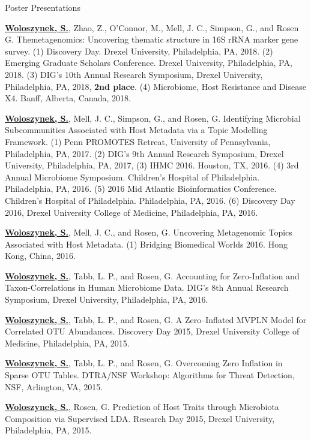 \begin{cventries}
\vspace{.5cm}
\cventry
    {}
    {Poster Presentations}
    {}
    {}
    {
     \begin{cvitems} %
        \item{\textbf{\underline{Woloszynek, S.}}, Zhao, Z., O’Connor, M., Mell, J. C., Simpson, G., and Rosen G. Themetagenomics: Uncovering thematic structure in 16S rRNA marker gene survey. (1) Discovery Day. Drexel University, Philadelphia, PA, 2018. (2) Emerging Graduate Scholars Conference. Drexel University, Philadelphia, PA, 2018. (3) DIG’s 10th Annual Research Symposium, Drexel University, Philadelphia, PA, 2018, \textbf{2nd place}. (4) Microbiome, Host Resistance and Disease X4. Banff, Alberta, Canada, 2018.}
        \item{\textbf{\underline{Woloszynek, S.}}, Mell, J. C., Simpson, G., and Rosen, G. Identifying Microbial Subcommunities Associated with Host Metadata via a Topic Modelling Framework. (1) Penn PROMOTES Retreat, University of Pennsylvania, Philadelphia, PA, 2017. (2) DIG’s 9th Annual Research Symposium, Drexel University, Philadelphia, PA, 2017, (3) IHMC 2016. Houston, TX, 2016. (4) 3rd Annual Microbiome Symposium. Children’s Hospital of Philadelphia. Philadelphia, PA, 2016. (5) 2016 Mid Atlantic Bioinformatics Conference. Children’s Hospital of Philadelphia. Philadelphia, PA, 2016. (6) Discovery Day 2016, Drexel University College of Medicine, Philadelphia, PA, 2016.}
        \item{\textbf{\underline{Woloszynek, S.}}, Mell, J. C., and Rosen, G. Uncovering Metagenomic Topics Associated with Host Metadata. (1) Bridging Biomedical Worlds 2016. Hong Kong, China, 2016.}
        \item{\textbf{\underline{Woloszynek, S.}}, Tabb, L. P., and Rosen, G. Accounting for Zero-Inflation and Taxon-Correlations in Human Microbiome Data. DIG’s 8th Annual Research Symposium, Drexel University, Philadelphia, PA, 2016.}
        \item{\textbf{\underline{Woloszynek, S.}}, Tabb, L. P., and Rosen, G. A Zero–Inflated MVPLN Model for Correlated OTU Abundances. Discovery Day 2015, Drexel University College of Medicine, Philadelphia, PA, 2015.}
        \item{\textbf{\underline{Woloszynek, S.}}, Tabb, L. P., and Rosen, G. Overcoming Zero Inflation in Sparse OTU Tables. DTRA/NSF Workshop: Algorithms for Threat Detection, NSF, Arlington, VA, 2015.}
        \item{\textbf{\underline{Woloszynek, S.}}, Rosen, G. Prediction of Host Traits through Microbiota Composition via Supervised LDA. Research Day 2015, Drexel University, Philadelphia, PA, 2015.}

\end{cvitems}}
\end{cventries}
